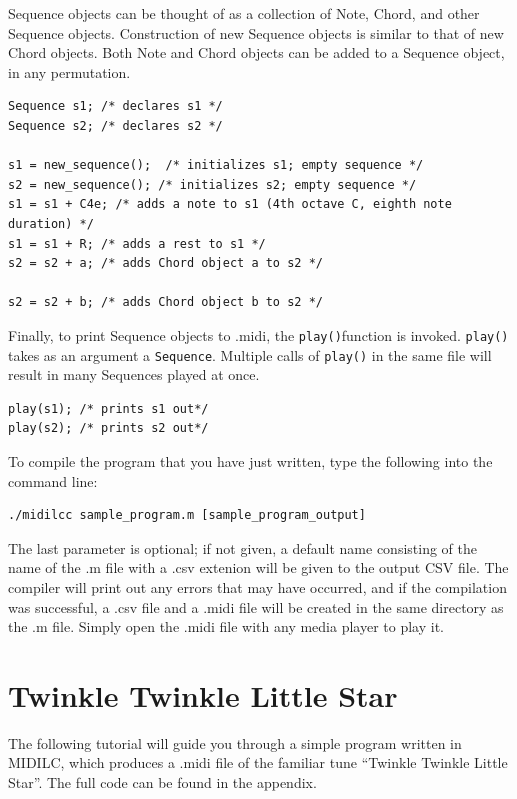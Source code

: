 \documentclass[12pt,A4]{book}
\begin{document}
Sequence objects can be thought of as a collection of Note, Chord, and other Sequence objects. Construction of new Sequence objects is similar to that of new Chord objects. Both Note and Chord objects can be added to a Sequence object, in any permutation.
\begin{verbatim}
Sequence s1; /* declares s1 */
Sequence s2; /* declares s2 */

s1 = new_sequence();  /* initializes s1; empty sequence */
s2 = new_sequence(); /* initializes s2; empty sequence */
s1 = s1 + C4e; /* adds a note to s1 (4th octave C, eighth note duration) */
s1 = s1 + R; /* adds a rest to s1 */
s2 = s2 + a; /* adds Chord object a to s2 */

s2 = s2 + b; /* adds Chord object b to s2 */
\end{verbatim}

Finally, to print Sequence objects to .midi, the \verb|play()|function is invoked. \verb|play()| takes as an argument a \verb|Sequence|. Multiple calls of \verb|play()| in the same file will result in many Sequences played at once.

\begin{verbatim}
play(s1); /* prints s1 out*/
play(s2); /* prints s2 out*/
\end{verbatim}

To compile the program that you have just written, type the following into the command line:

\begin{verbatim}
./midilcc sample_program.m [sample_program_output]
\end{verbatim}

The last parameter is optional; if not given, a default name consisting of the name of the .m file with a .csv extenion will be given to the output CSV file. The compiler will print out any errors that may have occurred, and if the compilation was successful, a .csv file and a .midi file will be created in the same directory as the .m file. Simply open the .midi file with any media player to play it.

\section{Twinkle Twinkle Little Star}

The following tutorial will guide you through a simple program written in MIDILC, which produces a .midi file of the familiar tune “Twinkle Twinkle Little Star”. The full code can be found in the appendix.
	
\end{document}

